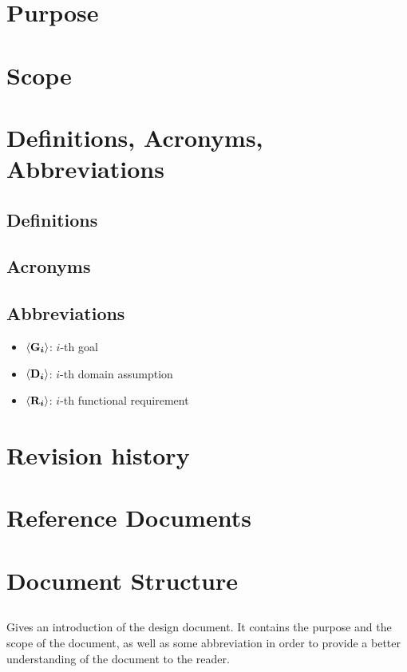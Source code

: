     \section{Purpose}
    
    \section{Scope}
    
    \section{Definitions, Acronyms, Abbreviations}
        \subsection{Definitions}
        \subsection{Acronyms}
        \subsection{Abbreviations}
        \begin{itemize}
            \item $\goal{i}$: $i$-th goal
            \item $\assumption{i}$: $i$-th domain assumption
            \item $\requirement{i}$: $i$-th functional requirement
        \end{itemize}
        
    \section{Revision history}
    \section{Reference Documents}
    \section{Document Structure}
        \subsection*{}
        Gives an introduction of the design document. It contains the purpose and the scope of the document, as well as some abbreviation in order to provide a better understanding of the document to the reader.


